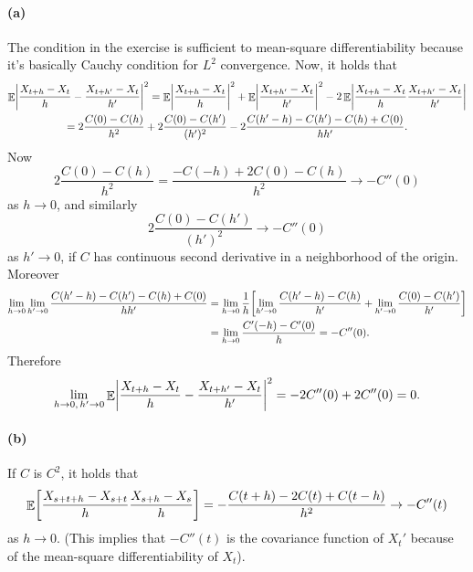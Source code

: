 \documentclass[a4paper,11pt]{article}
\theoremstyle{definition}
\theoremstyle{plain}
\theoremstyle{remark}
\DeclarePairedDelimiter{\abs}{\lvert}{\rvert}
\DeclarePairedDelimiter{\parq}{[}{]}
\DeclareMathOperator*{\expval}{\mathbb{E}}
\begin{document}
\paragraph*{(a)}

The condition in the exercise is sufficient to mean-square differentiability because it's basically Cauchy condition for $L^2$ convergence. Now, it holds that
\begin{multline*}
\expval\abs*{\frac{X_{t+h}-X_t}{h}-\frac{X_{t+h'}-X_t}{h'}}^2  = \expval\abs*{\frac{X_{t+h}-X_t}{h}}^2 + \expval\abs*{\frac{X_{t+h'}-X_t}{h'}}^2 - 2\expval\abs*{\frac{X_{t+h}-X_t}{h}\frac{X_{t+h'}-X_t}{h'}} \\  = 2\frac{C(0)-C(h)}{h^2} + 2\frac{C(0)-C(h')}{(h')^2} -2\frac{C(h'-h)-C(h')-C(h)+C(0)}{hh'}.
\end{multline*}
Now
$$
2\frac{C(0)-C(h)}{h^2} = \frac{-C(-h)+2C(0)-C(h)}{h^2} \to -C''(0)
$$
as $h\to 0$, and similarly 
$$
2\frac{C(0)-C(h')}{(h')^2}\to -C''(0)
$$
as $h'\to 0$, if $C$ has continuous second derivative in a neighborhood of the origin. Moreover
\begin{align*}
\lim_{h\to0}\lim_{h'\to0}\frac{C(h'-h)-C(h')-C(h)+C(0)}{hh'} & = \lim_{h\to0}\frac{1}{h}\parq*{\lim_{h'\to0}\frac{C(h'-h)-C(h)}{h'}+\lim_{h'\to0}\frac{C(0)-C(h')}{h'}} \\ & = \lim_{h\to0}\frac{C'(-h)-C'(0)}{h} = - C''(0).
\end{align*}
Therefore
$$
\lim_{h\to0,\,h'\to0}\expval\abs*{\frac{X_{t+h}-X_t}{h}-\frac{X_{t+h'}-X_t}{h'}}^2 = -2C''(0) + 2C''(0) = 0.
$$

\paragraph*{(b)}
 
If $C$ is $C^2$, it holds that
$$
\expval\parq*{\frac{X_{s+t+h}-X_{s+t}}{h}\frac{X_{s+h}-X_s}{h}} =-\frac{C(t+h)-2C(t) + C(t-h)}{h^2} \to -C''(t)
$$ 
as $h\to0$. (This implies that $-C''(t)$ is the covariance function of $X_t'$ because of the mean-square differentiability of $X_t$).
 
\end{document}
